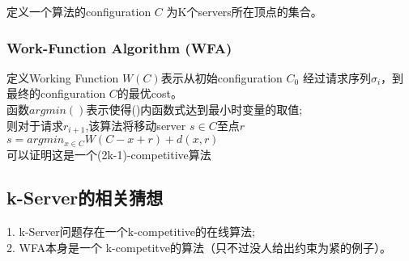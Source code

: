 \documentclass[11pt]{ctexart}
\begin{document}
定义一个算法的configuration $C$ 为K个servers所在顶点的集合。

\subsubsection{Work-Function Algorithm (WFA)}
定义Working Function $W(C)$表示从初始configuration $C_0$ 经过请求序列$\sigma_i$，到最终的configuration $C$的最优cost。\\

函数$arg min()$表示使得()内函数式达到最小时变量的取值;\\

则对于请求$r_{i+1}$,该算法将移动server $s \in C$至点$r$\\
$s=arg min_{x \in C}{W(C-x+r)+d(x,r)}$\\

可以证明这是一个(2k-1)-competitive算法\\


\subsection{k-Server的相关猜想}
1. k-Server问题存在一个k-competitive的在线算法;\\

2. WFA本身是一个 k-competitve的算法（只不过没人给出约束为紧的例子）。\\
\end{document}
